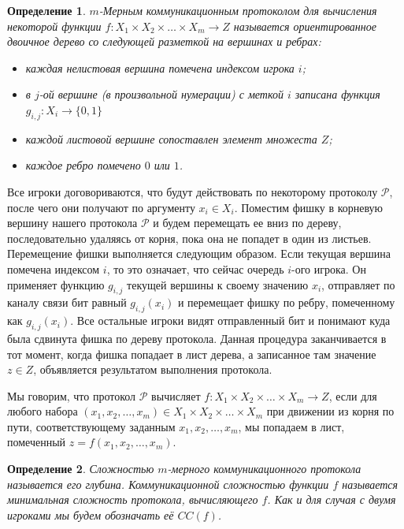 \documentclass[a4paper]{article}
\newtheorem*{mdefinition}{Определение}
\begin{document}
\begin{mdefinition}
    $m$-Мерным коммуникационным протоколом для вычисления некоторой функции $f:X_1\times X_2\times \ldots\times X_m\rightarrow Z$ называется
    ориентированное двоичное дерево со следующей разметкой на вершинах и ребрах:
    \begin{itemize}[noitemsep]
        \item каждая нелистовая вершина помечена индексом игрока $i$;
        \item в $j$-ой вершине (в произвольной нумерации) с меткой $i$ 
        записана функция $g_{i,j}:X_i\rightarrow \{0,1\}$
        \item каждой листовой вершине сопоставлен элемент множеста $Z$;
        \item каждое ребро помечено $0$ или $1$.

    \end{itemize}
\end{mdefinition}

Все игроки договориваются, что будут действовать по некоторому протоколу $\mathcal{P}$, после чего они 
получают по аргументу $x_i\in X_i$. Поместим фишку в корневую вершину нашего протокола
$\mathcal{P}$ и будем перемещать ее вниз по дереву, последовательно удаляясь от корня,
пока она не попадет в один из листьев. Перемещение фишки выполняется следующим образом. Если текущая 
вершина помечена индексом $i$, то это означает, что сейчас очередь $i$-ого игрока. Он применяет функцию 
$g_{i,j}$ текущей вершины к своему значению $x_i$, отправляет по каналу связи бит равный $g_{i,j}(x_i)$ и перемещает
фишку по ребру, помеченному как $g_{i,j}(x_i)$. Все остальные игроки видят отправленный бит и понимают 
куда была сдвинута фишка по дереву протокола. Данная процедура заканчивается в тот момент, когда фишка 
попадает в лист дерева, а записанное там значение $z\in Z$, объявляется результатом выполнения протокола.

Мы говорим, что протокол $\mathcal{P}$ вычисляет $f:X_1\times X_2\times \ldots\times X_m\rightarrow Z$, 
если для любого набора $(x_1, x_2, \ldots, x_m) \in X_1\times X_2 \times \ldots \times X_m$ при движении 
из корня по пути, соответствующему заданным $x_1, x_2, \ldots, x_m$, мы попадаем в лист, помеченный 
$z=f(x_1,x_2, \ldots,x_m)$.

\begin{mdefinition}
	Сложностью $m$-мерного коммуникационного протокола называется его глубина. Коммуникационной сложностью функции 
	$f$ называется минимальная сложность протокола, вычисляющего $f$. Как и для случая с двумя игроками 
	мы будем обозначать её $CC(f)$.
\end{mdefinition}
\end{document}
